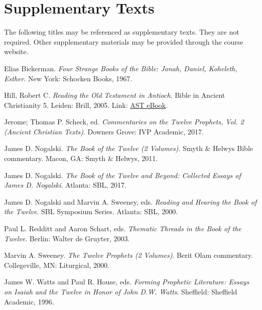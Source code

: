 \documentclass[titlepage]{article}
\begin{document}
\section{Supplementary Texts}
\label{supplementary}

The following titles may be referenced as supplementary texts. They are
not required. Other supplementary materials may be provided through the
course website.

\begingroup
\renewcommand{\section}[2]{}%
\begin{thebibliography}{3}%

	 Elias Bickerman.
	\emph{Four Strange Books of the Bible: Jonah, Daniel, Koheleth, Esther}.
	New York: Schocken Books, 1967.

	 Hill, Robert C.
	\emph{Reading the Old Testament in Antioch}. Bible in Ancient Christianity 5.
	Leiden: Brill, 2005. Link: \href{http://ezproxy.astheology.ns.ca:2048/login?url=http://search.ebscohost.com/login.aspx?direct=true&db=nlebk&AN=173885&site=ehost-live&scope=site}{AST eBook}.

	 Jerome; Thomas P. Scheck, ed.
	\emph{Commentaries on the Twelve Prophets, Vol. 2 (Ancient Christian Texts)}.
	Downers Grove: IVP Academic, 2017.

	 James D. Nogalski.
	\emph{The Book of the Twelve (2 Volumes)}. Smyth \& Helwys Bible commentary.
	Macon, GA: Smyth \& Helwys, 2011.

	 James D. Nogalski.
	\emph{The Book of the Twelve and Beyond: Collected Essays of James D. Nogalski}.
	Atlanta: SBL, 2017.

	 James D. Nogalski and Marvin A. Sweeney, eds.
	\emph{Reading and Hearing the Book of the Twelve}. SBL Symposium Series.
	Atlanta: SBL, 2000.

	 Paul L. Redditt and Aaron Schart, eds.
	\emph{Thematic Threads in the Book of the Twelve}.
	Berlin: Walter de Gruyter, 2003.

	 Marvin A. Sweeney.
	\emph{The Twelve Prophets (2 Volumes)}. Berit Olam commentary.
	Collegeville, MN: Liturgical, 2000.

	 James W. Watts and Paul R. House, eds.
	\emph{Forming Prophetic Literature: Essays on Isaiah and the Twelve in Honor of John D.W. Watts}.
	Sheffield: Sheffield Academic, 1996.

\end{thebibliography}
\endgroup
\end{document}
